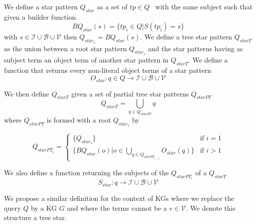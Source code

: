 \begin{definition}\label{def:starPattern}
    We define a star pattern $Q_{star}$ as a set of $tp \in Q$~\cite{Karim2020} with the same subject such that 
    given a builder function 
    \begin{equation}
        BQ_{star}(s) = \{tp_i \in Q| S(tp_i) = s\}
    \end{equation}
    with $s \in \mathcal{I} \cup \mathcal{B} \cup \mathcal{V}$ then $Q_{star_s} = BQ_{star}(s)$.
    We define a tree star pattern $Q_{starT}$ as the union between a root star pattern $Q_{star_s}$
    and the star patterns having as subject term an object term of another star pattern in $Q_{starT}$.
    We define a function that returns every non-literal object terms of a star pattern
    \begin{equation}
        O_{star}: q \in Q \rightarrow  \mathcal{I} \cup \mathcal{B} \cup \mathcal{V}
    \end{equation}

    We then define $Q_{starT}$ given a  set of partial tree star patterns $Q_{starPT}$
    \begin{equation}
        Q_{starT} = \bigcup_{q \in Q_{starPT}} q
    \end{equation}
    where $Q_{starPT}$ is formed with a root $Q_{star_s}$ by

    \begin{equation}
            Q_{starPT_i} =
        \begin{cases}
            \{Q_{star_s}\} & \text{if } i = 1 \\
            \{BQ_{star}(o)| o \in \bigcup\limits_{q \in Q_{starPT_{i-1}}} O_{star}(q)\} & \text{if } i>1
        \end{cases}
    \end{equation}

    We also define a function returning the subjects of the $Q_{starPT_i}$ of a $Q_{starT}$
    \begin{equation}
        S_{star}: q \rightarrow  \mathcal{I} \cup \mathcal{B} \cup \mathcal{V}
    \end{equation}

    We propose a similar definition for the context of KGs where we replace the query $Q$ by a KG $G$ and where the terms 
    cannot be a $v \in \mathcal{V}$. 
    We denote this structure a tree star. 

\end{definition}


